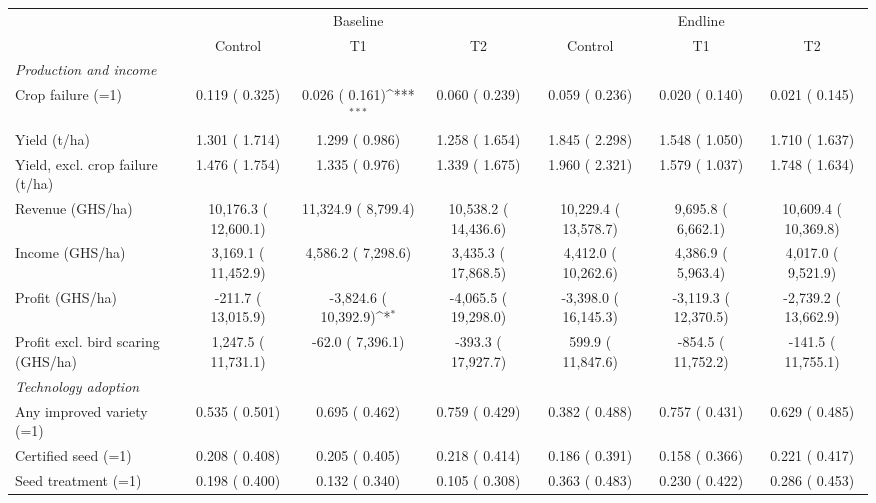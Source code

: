\def\sym#1{\ifmmode^{#1}\else\(^{#1}\)\fi}
\begin{tabular}{lcccccc}
\toprule
 & \multicolumn{3}{c}{Baseline} & \multicolumn{3}{c}{Endline} \\
\cmidrule(lr){2-4}\cmidrule(lr){5-7}
 & Control & T1 & T2 & Control & T1 & T2 \\
\midrule
\multicolumn{7}{l}{\textit{Production and income}}\\
Crop failure (=1) &     0.119 (    0.325) &     0.026 (    0.161)\sym{***} &     0.060 (    0.239) &     0.059 (    0.236) &     0.020 (    0.140) &     0.021 (    0.145) \\
Yield (t/ha) &     1.301 (    1.714) &     1.299 (    0.986) &     1.258 (    1.654) &     1.845 (    2.298) &     1.548 (    1.050) &     1.710 (    1.637) \\
\quad Yield, excl. crop failure (t/ha) &     1.476 (    1.754) &     1.335 (    0.976) &     1.339 (    1.675) &     1.960 (    2.321) &     1.579 (    1.037) &     1.748 (    1.634) \\
Revenue (GHS/ha) &     10,176.3 (    12,600.1) &     11,324.9 (     8,799.4) &     10,538.2 (    14,436.6) &     10,229.4 (    13,578.7) &      9,695.8 (     6,662.1) &     10,609.4 (    10,369.8) \\
Income (GHS/ha) &      3,169.1 (    11,452.9) &      4,586.2 (     7,298.6) &      3,435.3 (    17,868.5) &      4,412.0 (    10,262.6) &      4,386.9 (     5,963.4) &      4,017.0 (     9,521.9) \\
Profit (GHS/ha) &       -211.7 (    13,015.9) &     -3,824.6 (    10,392.9)\sym{*} &     -4,065.5 (    19,298.0) &     -3,398.0 (    16,145.3) &     -3,119.3 (    12,370.5) &     -2,739.2 (    13,662.9) \\
Profit excl. bird scaring (GHS/ha) &      1,247.5 (    11,731.1) &        -62.0 (     7,396.1) &       -393.3 (    17,927.7) &        599.9 (    11,847.6) &       -854.5 (    11,752.2) &       -141.5 (    11,755.1) \\
\multicolumn{7}{l}{\textit{Technology adoption}}\\
Any improved variety (=1) &     0.535 (    0.501) &     0.695 (    0.462) &     0.759 (    0.429) &     0.382 (    0.488) &     0.757 (    0.431) &     0.629 (    0.485) \\
Certified seed (=1) &     0.208 (    0.408) &     0.205 (    0.405) &     0.218 (    0.414) &     0.186 (    0.391) &     0.158 (    0.366) &     0.221 (    0.417) \\
Seed treatment (=1) &     0.198 (    0.400) &     0.132 (    0.340) &     0.105 (    0.308) &     0.363 (    0.483) &     0.230 (    0.422) &     0.286 (    0.453) \\

\end{tabular}
